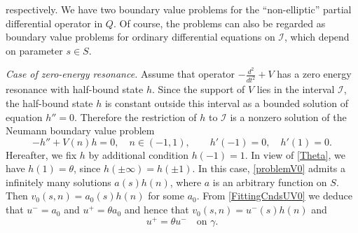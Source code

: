 \documentclass[reqno]{amsart}
\theoremstyle{plain}
\numberwithin{equation}{section}
\newcommand{\cI}{\mathcal{I}}
\begin{document}
respectively.
We have two boundary value problems for the ``non-ellip\-tic'' partial differential operator in $Q$. Of course,  the problems can also be  regarded as  boun\-da\-ry value problems for ordinary differential equations on $\cI$, which depend on parameter $s\in S$.



\textit{Case of zero-energy resonance.}
Assume that operator $-\frac{d^2}{dt^2}+V$ has a zero energy resonance with half-bound state $h$. Since the support of $V$ lies in  the interval $\cI$, the half-bound state $h$ is  constant  outside this interval as a bounded solution of equation $h''=0$.
Therefore the restriction of $h$ to $\cI$ is a nonzero solution of the Neumann boundary value problem
\begin{equation}\label{NeumanProblem}
     -h''+V(n)h= 0,\quad n\in(-1,1),\qquad   h'(-1)=0, \quad h'(1)=0.
\end{equation}
Hereafter, we fix $h$ by additional condition $h(-1)=1$. In view of
\eqref{Theta}, we have $h(1)=\theta$, since $h(\pm\infty)=h(\pm 1)$.
In this case, \eqref{problemV0}  admits a infinitely many solutions $a(s)h(n)$, where $a$ is an arbitrary function on $S$.
Then $v_0(s,n)=a_0(s)h(n)$ for some $a_0$. From \eqref{FittingCndsUV0} we deduce that $u^-=a_0$ and $u^+=\theta a_0$ and hence that $v_0(s,n)=u^-(s)h(n)$ and
\begin{equation}\label{RCond0}
     u^+=\theta u^-\quad\text {on }\gamma.
\end{equation}
\end{document}
